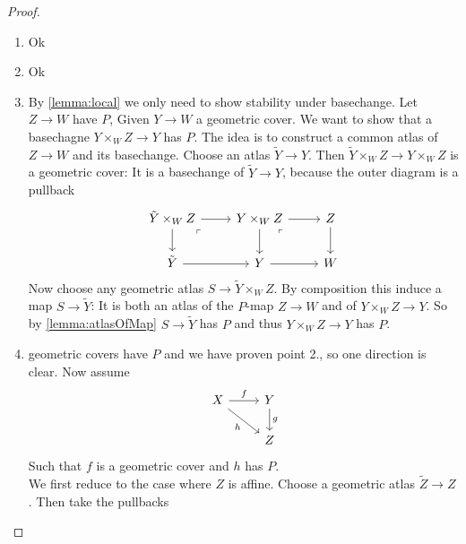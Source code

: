 \documentclass{article}
\begin{document}
\begin{proof}
	\begin{enumerate}
		\item Ok
		\item Ok
		\item By \ref{lemma:local} we only need to show stability under basechange. Let $Z \to W$ have $P$, Given $Y \to W$ a geometric cover. We want to show that a basechagne $Y \times_W Z \to Y$ has $P$. The idea is to construct a common atlas of $Z \to W$ and its basechange. Choose an atlas $\tilde Y \to Y$. Then $\tilde Y \times_W Z \to Y \times_W Z$ is a geometric cover: It is a basechange of $\tilde Y \to Y$, because the outer diagram is a pullback
		\[\begin{tikzcd}
			{\tilde Y \times_W Z} & {Y \times_W Z} & Z \\
			{\tilde Y} & Y & W
			\arrow[from=1-1, to=1-2]
			\arrow[from=1-1, to=2-1]
			\arrow["\ulcorner"{anchor=center, pos=0.125}, draw=none, from=1-1, to=2-2]
			\arrow[from=1-2, to=1-3]
			\arrow[from=1-2, to=2-2]
			\arrow["\ulcorner"{anchor=center, pos=0.125}, draw=none, from=1-2, to=2-3]
			\arrow[from=1-3, to=2-3]
			\arrow[from=2-1, to=2-2]
			\arrow[from=2-2, to=2-3]
		\end{tikzcd}\]
		Now choose any geometric atlas $S \to \tilde Y \times_W Z$. By composition this induce a map $S \to \tilde Y$: 
		It is both an atlas of the $P$-map $Z \to W$ and of $ Y\times_W Z \to Y$. So by \ref{lemma:atlasOfMap} $S \to \tilde Y$ has $P$ and thus $Y \times_W Z \to Y$ has $P$. 
		\item geometric covers have $P$ and we have proven point 2., so one direction is clear.  Now assume 
		\[\begin{tikzcd}
			X & Y \\
			& Z
			\arrow["f", from=1-1, to=1-2]
			\arrow["h"', from=1-1, to=2-2]
			\arrow["g", from=1-2, to=2-2]
		\end{tikzcd}\]
		Such that $f$ is a geometric cover and $h$ has $P$. \\
		We first reduce to the case where $Z$ is affine. Choose a geometric atlas $\tilde Z \to Z$. Then take the pullbacks

\end{enumerate}
\end{proof}
\end{document}
